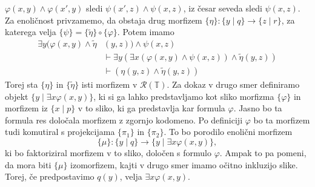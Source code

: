 \documentclass[../kategoricna_logika.tex]{subfiles}
\begin{document}
\begin{dokaz}
\begin{enumerate}[label=(\roman*)]
    $\varphi(x,y) \land \varphi(x',y)$ sledi
    $\psi(x',z) \land \psi(x,z)$, iz česar seveda sledi $\psi(x,z)$.
    Za enoličnost privzamemo, da obstaja drug morfizem
    $\{\eta\} : \{y \mid q\} \to \{z \mid r\}$, za katerega velja
    $\{\psi\} = \{\tilde{\eta}\} \circ \{\varphi\}$. Potem imamo
    \begin{align*}
      \exists y (\varphi(x,y) \land \tilde{\eta}&(y,z)) \land \psi(x,z) \\
                                                &\vdash \exists y (\exists x(\varphi(x,y) \land \psi(x,z)) \land \tilde{\eta}(y,z)) \\
                                                &\vdash (\eta(y,z) \land \tilde{\eta}(y,z))
    \end{align*}
    Torej sta $\{\eta\}$ in $\{\tilde{\eta}\}$ isti morfizem v
    $\mathcal{R}(\mathbb{T})$. Za dokaz v drugo smer definiramo objekt
    $\{ y \mid \exists x \varphi(x,y)\}$, ki si ga lahko predstavljamo kot
    sliko morfizma $\{\varphi\}$ in morfizem iz $\{x \mid p\}$ v to sliko, ki
    ga predstavlja kar formula $\varphi$. Jasno bo ta formula res določala
    morfizem z zgornjo kodomeno. Po definiciji $\varphi$ bo ta morfizem tudi komutiral
    s projekcijama $\{\pi_1\}$ in $\{\pi_2\}$. To bo porodilo enolični morfizem
    \[\{\mu\} : \{y \mid q\} \to \{ y \mid \exists x \varphi(x,y)\},\]
    ki bo
    faktoriziral morfizem v to sliko, določen s formulo $\varphi$. Ampak to pa
    pomeni, da mora biti $\{\mu\}$ izomorfizem, kajti v drugo smer imamo očitno
    inkluzijo slike. Torej, če predpostavimo $q(y)$, velja $\exists x \varphi(x,y)$.



\end{enumerate}
\end{dokaz}
\end{document}
